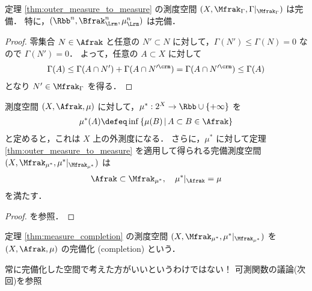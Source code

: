 \begin{proposition}
    定理 \ref{thm:outer_measure_to_measure} の測度空間 $(X,\Mfrak_\Gamma,\Gamma\vert_{\Mfrak_\Gamma})$ は完備．
    特に，$(\Rbb^n,\Bfrak_\Lrm^n,\mu_\Lrm^n)$ は完備．
\end{proposition}

\begin{proof}
    零集合 $N\in\Afrak$ と任意の $N'\subset N$ に対して，$\Gamma(N')\le\Gamma(N)=0$ なので $\Gamma(N')=0$．
    よって，任意の $A\subset X$ に対して
    \begin{align*}
        \Gamma(A)
        \le\Gamma(A\cap N')+\Gamma(A\cap N'^\crm)
        =\Gamma(A\cap N'^\crm)
        \le\Gamma(A)
    \end{align*}
    となり $N'\in\Mfrak_\Gamma$ を得る．
\end{proof}

\begin{theorem}\label{thm:measure_completion}
    測度空間 $(X,\Afrak,\mu)$ に対して，$\mu^\ast:2^X\to\Rbb\cup\{+\infty\}$ を
    \begin{align*}
        \mu^\ast(A)\defeq\inf\left\{
            \mu(B)\,\middle\vert\,A\subset B\in\Afrak
        \right\}
    \end{align*}
    と定めると，これは $X$ 上の外測度になる．
    さらに，$\mu^\ast$ に対して定理 \ref{thm:outer_measure_to_measure} を適用して得られる完備測度空間
    $(X,\Mfrak_{\mu^*},\mu^\ast\vert_{\Mfrak_{\mu^\ast}})$ は
    \begin{align*}
        \Afrak\subset\Mfrak_{\mu^*},\quad
        \mu^\ast\vert_\Afrak=\mu
    \end{align*}
    を満たす．
\end{theorem}

\begin{proof}
    \cite[定理 8.4]{It63} を参照．
\end{proof}

\begin{definition}
    定理 \ref{thm:measure_completion} の測度空間 $(X,\Mfrak_{\mu^*},\mu^\ast\vert_{\Mfrak_{\mu^\ast}})$ を
    $(X,\Afrak,\mu)$ の完備化 (completion) という．
\end{definition}

常に完備化した空間で考えた方がいいというわけではない！ %
可測関数の議論(次回)を参照

